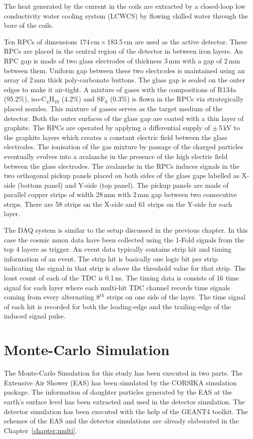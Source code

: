 The heat generated by the current in the
coils are extracted by a closed-loop low conductivity water cooling
system (LCWCS) by flowing chilled water through the bore of the coils.

Ten RPCs of dimensions 174\,cm\,$\times$\,183.5\,cm are used as the
active detector. These RPCs are placed in the central region of
the detector in between iron layers.
An RPC gap is made of two glass electrodes of thickness 3\,mm with
a gap of 2\,mm between them. Uniform gap between these two electrodes
is maintained using an array of 2\,mm thick poly-carbonate buttons.
The glass gap is sealed on the outer edges to make it air-tight.
A mixture of gases with the compositions of R134a (95.2\%),
iso-C$_4$H$_{10}$ (4.2\%) and SF$_6$ (0.3\%) is flown in the RPCs
via strategically placed nozzles. This mixture of gasses serves as the
target medium of the detector.
Both the outer surfaces of the glass gap are coated with a thin layer
of graphite. The RPCs are operated by applying a differential supply of
$\pm$\,5\,kV to the graphite layers which creates a constant electric
field between the glass electrodes. The ionisation of the gas mixture
by passage of the charged particles eventually evolves into a
avalanche in the presence of the high electric field between the glass
electrodes. The avalanche in the RPCs induces signals in the two
orthogonal pickup panels placed on both sides of the glass gaps
labelled as X-side (bottom panel) and Y-side (top panel). The pickup panels
  are made of parallel
copper strips of width 28\,mm with 2\,mm gap between two consecutive
strips. There are 58 strips on the X-side and 61 strips on the %
Y-side for each layer.

The DAQ system is similar to the setup discussed in the previous
chapter. In this case the cosmic muon data have been collected using
the 1-Fold signals from the top 4 layers as trigger.
An event data typically contains strip hit and timing information
of an event. The strip hit is basically one logic bit per strip
indicating the signal in that strip is above the threshold value
for that strip. The least count of each of the TDC is 0.1\,ns.
The timing data is consists of 16 time signal for
each layer where each multi-hit TDC channel records time signals
coming from every alternating 8$^{th}$ strips on one side of the layer.
The time signal of each hit is recorded for both the leading-edge and
the trailing-edge of the induced signal pulse.

\section{Monte-Carlo Simulation}
The Monte-Carlo Simulation for this study has been executed in
two parts. The Extensive Air Shower (EAS) has been simulated
by the CORSIKA simulation package\cite{corsika763}. The information
of daughter particles generated by the EAS at the earth's surface
level has been extracted and used in the detector simulation.
The detector simulation has been executed with the help
of the GEANT4 toolkit\cite{geant4}. The schemes of the EAS and the
detector simulations are already elaborated in the
Chapter~\ref{chapter:multi}.

